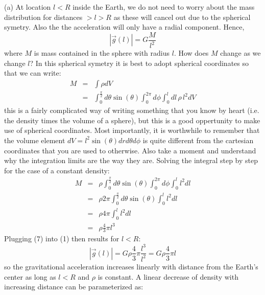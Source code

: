 \documentclass[a4paper,12pt]{article}
\newif\ifanswers
\begin{document}
\ifanswers
    \begin{tcolorbox}[enhanced jigsaw,breakable,pad at break*=1mm,
    colback=blue!5!white,colframe=babyblueeyes,title=Solutions,
    watermark color=white]
 
      (a) At location $l<R$ inside the Earth, we do not need to worry about the mass distribution for distances $>l>R$ as these will cancel out due to the spherical symetry. Also the the acceleration will only have a radial component. Hence,
    \begin{equation}
        |\vec{g}(l)| = G\frac{M}{l^2}
    \end{equation}
    where $M$ is mass contained in the sphere with radius $l$. How does $M$ change as we change $l$? In this spherical symetry it is best to adopt spherical coordinates so that we can write: 
    \begin{eqnarray}
    M &=& \int \rho dV \\ 
    &=& \int_0^{\frac{\pi}{2}} d\theta \sin(\theta) \int_0^{2\pi}  d\phi \int_0^l dl\,\rho\,l^2 dV
    \end{eqnarray}
    this is a fairly complicated way of writing something that you know by heart (i.e. the density times the volume of a sphere), but this is a good oppertunity to make use of spherical coordinates. Most importantly, it is worthwhile to remember that the volume element $dV = l^2 \sin(\theta)drd\theta d\phi$ is quite different from the cartesian coordinates that you are used to otherwise. Also take a moment and understand why the integration limits are the way they are. Solving the integral step by step for the case of a constant density:
    \begin{eqnarray}
        M &=& \rho \int_0^{\frac{\pi}{2}} d\theta \sin(\theta)\int_0^{2\pi}  d\phi \int_0^l l^2 dl \\
         &=&\rho 2\pi \int_0^{\frac{\pi}{2}} d\theta \sin(\theta)\int_0^l l^2dl\\
         &=&\rho 4\pi \int_0^l l^2dl \\ 
         &=&\rho \frac{4}{3}\pi l^3
    \end{eqnarray}
    Plugging (7) into (1) then results for $l<R$:
    \begin{equation}
        |\vec{g}(l)| = G  \rho \frac{4}{3}\pi \frac{l^3}{l^2} = G  \rho \frac{4}{3}\pi l
    \end{equation}
    so the gravitational acceleration increases linearly with distance from the Earth's center as long as $l<R$ and $\rho$ is constant. A linear decrease of density with increasing distance can be parameterized as:

\end{tcolorbox}
\end{document}
